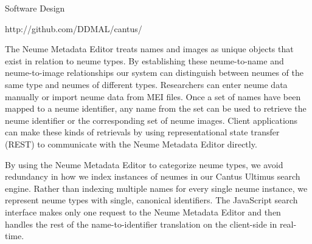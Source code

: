 \documentclass[final]{beamer}
\begin{document}
\begin{frame}[fragile,t]
\begin{columns}
\begin{column}{0.47\textwidth}
\begin{block}{Software Design}
            \begin{center}
                \vspace{-0.75\baselineskip}
                \small{http://github.com/DDMAL/cantus/}
                \normalsize
                \vspace{0.25\baselineskip}
            \end{center}
The Neume Metadata Editor treats names and images as unique objects that exist in relation to neume types. By establishing these neume-to-name and neume-to-image relationships our system can distinguish between neumes of the same type and neumes of different types. Researchers can enter neume data manually or import neume data from MEI files.
Once a set of names have been mapped to a neume identifier, any name from the set can be used to retrieve the neume identifier or the corresponding set of neume images.
Client applications can make these kinds of retrievals by using representational state transfer (REST) to communicate with the Neume Metadata Editor directly.\\
\vspace{\baselineskip}

By using the Neume Metadata Editor to categorize neume types, we avoid redundancy in how we index instances of neumes in our Cantus Ultimus search engine. Rather than indexing multiple names for every single neume instance, we represent neume types with single, canonical identifiers. The JavaScript search interface makes only one request to the Neume Metadata Editor and then handles the rest of the name-to-identifier translation on the client-side in real-time.
        
        
        
        


\end{block}
\end{column}
\end{columns}
\end{frame}
\end{document}
